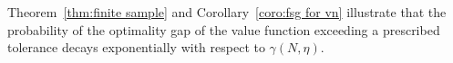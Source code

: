 \documentclass[letterpaper, 10 pt, conference]{ieeeconf}  %
\begin{document}

Theorem\ \ref{thm:finite sample} and Corollary\ \ref{coro:fsg for vn} illustrate that the probability of the optimality gap of the value function exceeding a prescribed tolerance decays exponentially with respect to $\gamma(N,\eta)$. 
\end{document}
